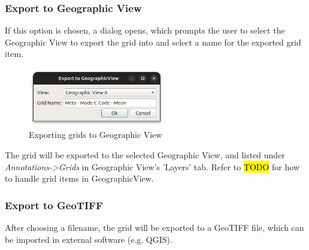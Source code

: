 \subsubsection{Export to Geographic View}

If this option is chosen, a dialog opens, which prompts the user to select the Geographic View to export the grid into and 
select a name for the exported grid item.

\begin{figure}[H]
    \center
    \includegraphics[width=6cm,frame]{figures/grid_export_geographic.png}
  \caption{Exporting grids to Geographic View}
\end{figure}

The grid will be exported to the selected Geographic View, and listed under \textit{Annotations->Grids} in Geographic View's 'Layers' tab.
Refer to \hl{TODO} for how to handle grid items in GeographicView.

\subsubsection{Export to GeoTIFF}

After choosing a filename, the grid will be exported to a GeoTIFF file, which can be imported in external software (e.g. QGIS).





